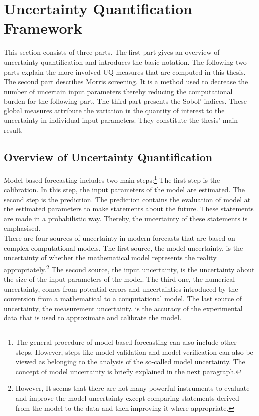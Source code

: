 \newpage

\section{Uncertainty Quantification Framework}
\thispagestyle{plain} %

This section consists of three parts. The first part gives an overview of uncertainty quantification and introduces the basic notation. The following two parts explain the more involved UQ measures that are computed in this thesis.
The second part describes Morris screening. It is a method used to decrease the number of uncertain input parameters thereby reducing the computational burden for the following part.
The third part presents the Sobol' indices. These global measures attribute the variation in the quantity of interest to the uncertainty in individual input parameters. They constitute the thesis' main result.

\subsection{Overview of Uncertainty Quantification}
Model-based forecasting includes two main steps:\footnote{The general procedure of model-based forecasting can also include other steps. However, steps like model validation and model verification can also be viewed as belonging to the analysis of the so-called model uncertainty. The concept of model uncertainty is briefly explained in the next paragraph.} The first step is the calibration. In this step, the input parameters of the model are estimated. The second step is the prediction. The prediction contains the evaluation of model at the estimated parameters to make statements about the future. These statements are made in a probabilistic way. Thereby, the uncertainty of these statements is emphasised.\\
\newline
There are four sources of uncertainty in modern forecasts that are based on complex computational models. The first source, the model uncertainty, is the uncertainty of whether the mathematical model represents the reality appropriately.\footnote{However, It seems that there are not many powerful instruments to evaluate and improve the model uncertainty except comparing statements derived from the model to the data and then improving it where appropriate.} The second source, the input uncertainty, is the uncertainty about the size of the input parameters of the model. The third one, the numerical uncertainty, comes from potential errors and uncertainties introduced by the conversion from a mathematical to a computational model. The last source of uncertainty, the measurement uncertainty, is the accuracy of the experimental data that is used to approximate and calibrate the model.

